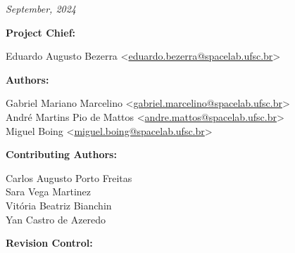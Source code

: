 %
%
%
%
%

%
%
%
%
%

\thispagestyle{empty}

\begin{center}

\textbf{\thetitle}

\textit{September, 2024}

\vspace{1cm}

\textbf{Project Chief:}

Eduardo Augusto Bezerra <\href{mailto:eduardo.bezerra@spacelab.ufsc.br}{eduardo.bezerra@spacelab.ufsc.br}>

\vspace{1cm}

\textbf{Authors:}

Gabriel Mariano Marcelino <\href{mailto:gabriel.marcelino@spacelab.ufsc.br}{gabriel.marcelino@spacelab.ufsc.br}> \\
André Martins Pio de Mattos <\href{mailto:andre.mattos@spacelab.ufsc.br}{andre.mattos@spacelab.ufsc.br}> \\
Miguel Boing <\href{mailto:miguel.boing@spacelab.ufsc.br}{miguel.boing@spacelab.ufsc.br}> \\

\vspace{1cm}

\textbf{Contributing Authors:}

Carlos Augusto Porto Freitas \\
Sara Vega Martinez \\
Vitória Beatriz Bianchin \\
Yan Castro de Azeredo \\

\vspace{1cm}

\textbf{Revision Control:}

\end{center}

